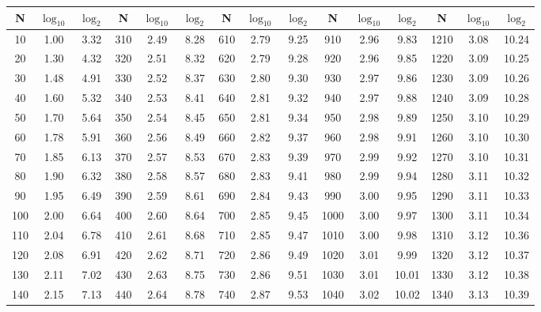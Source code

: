 \documentclass[12pt,a4paper]{article}
\begin{document}
\begin{center}
\scriptsize
\renewcommand{\arraystretch}{1.2}
\begin{tabular}{|c|c|c|c|c|c|c|c|c|c|c|c|c|c|c|}
\hline
\textbf{N} & \textbf{$\log_{10}$} & \textbf{$\log_2$} & \textbf{N} & \textbf{$\log_{10}$} & \textbf{$\log_2$} & \textbf{N} & \textbf{$\log_{10}$} & \textbf{$\log_2$} & \textbf{N} & \textbf{$\log_{10}$} & \textbf{$\log_2$} & \textbf{N} & \textbf{$\log_{10}$} & \textbf{$\log_2$} \\ \hline
10 & 1.00 & 3.32 & 310 & 2.49 & 8.28 & 610 & 2.79 & 9.25 & 910 & 2.96 & 9.83 & 1210 & 3.08 & 10.24 \\ \hline
20 & 1.30 & 4.32 & 320 & 2.51 & 8.32 & 620 & 2.79 & 9.28 & 920 & 2.96 & 9.85 & 1220 & 3.09 & 10.25 \\ \hline
30 & 1.48 & 4.91 & 330 & 2.52 & 8.37 & 630 & 2.80 & 9.30 & 930 & 2.97 & 9.86 & 1230 & 3.09 & 10.26 \\ \hline
40 & 1.60 & 5.32 & 340 & 2.53 & 8.41 & 640 & 2.81 & 9.32 & 940 & 2.97 & 9.88 & 1240 & 3.09 & 10.28 \\ \hline
50 & 1.70 & 5.64 & 350 & 2.54 & 8.45 & 650 & 2.81 & 9.34 & 950 & 2.98 & 9.89 & 1250 & 3.10 & 10.29 \\ \hline
60 & 1.78 & 5.91 & 360 & 2.56 & 8.49 & 660 & 2.82 & 9.37 & 960 & 2.98 & 9.91 & 1260 & 3.10 & 10.30 \\ \hline
70 & 1.85 & 6.13 & 370 & 2.57 & 8.53 & 670 & 2.83 & 9.39 & 970 & 2.99 & 9.92 & 1270 & 3.10 & 10.31 \\ \hline
80 & 1.90 & 6.32 & 380 & 2.58 & 8.57 & 680 & 2.83 & 9.41 & 980 & 2.99 & 9.94 & 1280 & 3.11 & 10.32 \\ \hline
90 & 1.95 & 6.49 & 390 & 2.59 & 8.61 & 690 & 2.84 & 9.43 & 990 & 3.00 & 9.95 & 1290 & 3.11 & 10.33 \\ \hline
100 & 2.00 & 6.64 & 400 & 2.60 & 8.64 & 700 & 2.85 & 9.45 & 1000 & 3.00 & 9.97 & 1300 & 3.11 & 10.34 \\ \hline
110 & 2.04 & 6.78 & 410 & 2.61 & 8.68 & 710 & 2.85 & 9.47 & 1010 & 3.00 & 9.98 & 1310 & 3.12 & 10.36 \\ \hline
120 & 2.08 & 6.91 & 420 & 2.62 & 8.71 & 720 & 2.86 & 9.49 & 1020 & 3.01 & 9.99 & 1320 & 3.12 & 10.37 \\ \hline
130 & 2.11 & 7.02 & 430 & 2.63 & 8.75 & 730 & 2.86 & 9.51 & 1030 & 3.01 & 10.01 & 1330 & 3.12 & 10.38 \\ \hline
140 & 2.15 & 7.13 & 440 & 2.64 & 8.78 & 740 & 2.87 & 9.53 & 1040 & 3.02 & 10.02 & 1340 & 3.13 & 10.39 \\ \hline

\end{tabular}
\end{center}
\end{document}
